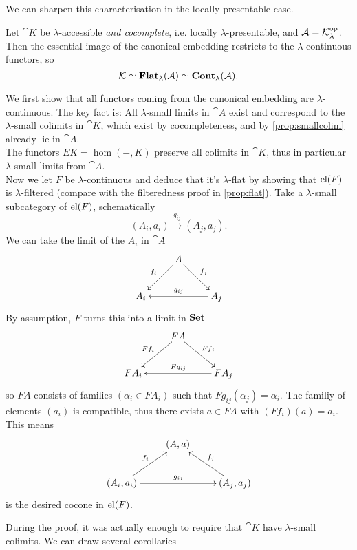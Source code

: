 We can sharpen this characterisation in the locally presentable case.
\begin{Proposition}
Let $\cat K$ be $\lambda$-accessible \emph{and cocomplete}, i.e. locally $\lambda$-presentable, and $\mathcal{A} = \mathcal{K}^{\textrm{op}}_\lambda$. Then the essential image of the canonical embedding restricts to the $\lambda$-continuous functors, so 
\[ \mathcal{K} \simeq \mathbf{Flat}_\lambda(\mathcal{A}) \simeq \mathbf{Cont}_\lambda(\mathcal{A}). \]
\end{Proposition}
\begin{Proof}
We first show that all functors coming from the canonical embedding are $\lambda$-continuous. The key fact is: All $\lambda$-small limits in $\cat A$ exist and correspond to the $\lambda$-small colimits in $\cat K$, which exist by cocompleteness, and by \ref{prop:smallcolim} already lie in $\cat A$. \\

The functors $EK = \hom(-, K)$ preserve all colimits in $\cat K$, thus in particular $\lambda$-small limits from $\cat A$. \\

Now we let $F$ be $\lambda$-continuous and deduce that it's $\lambda$-flat by showing that $\textrm{el}(F)$ is $\lambda$-filtered (compare with the filteredness proof in \ref{prop:flat}). Take a $\lambda$-small subcategory of $\textrm{el}(F)$, schematically
\[ (A_i,a_i) \xrightarrow{g_{ij}} (A_j,a_j). \]
We can take the limit of the $A_i$ in $\cat A$
\[
\xymatrix{
& A \ar[ld]_{f_i} \ar[rd]^{f_j} & \\
A_i & & A_j \ar[ll]_{g_{ij}}
}\]
By assumption, $F$ turns this into a limit in $\mathbf{Set}$
\[
\xymatrix{
& FA \ar[ld]_{Ff_i} \ar[rd]^{Ff_j} & \\
FA_i & & FA_j \ar[ll]_{Fg_{ij}}
}\]
so $FA$ consists of families $(\alpha_i \in FA_i)$ such that $Fg_{ij}(\alpha_j) = \alpha_i$. The familiy of elements $(a_i)$ is compatible, thus there exists $a \in FA$ with $(Ff_i)(a) = a_i$. This means \[
\xymatrix{
& (A,a) & \\
(A_i,a_i) \ar[ru]^{f_i} \ar[rr]^{g_{ij}} & & (A_j,a_j) \ar[lu]_{f_j}
}\]
is the desired cocone in $\textrm{el}(F)$.
\end{Proof}

During the proof, it was actually enough to require that $\cat K$ have $\lambda$-small colimits. We can draw several corollaries

